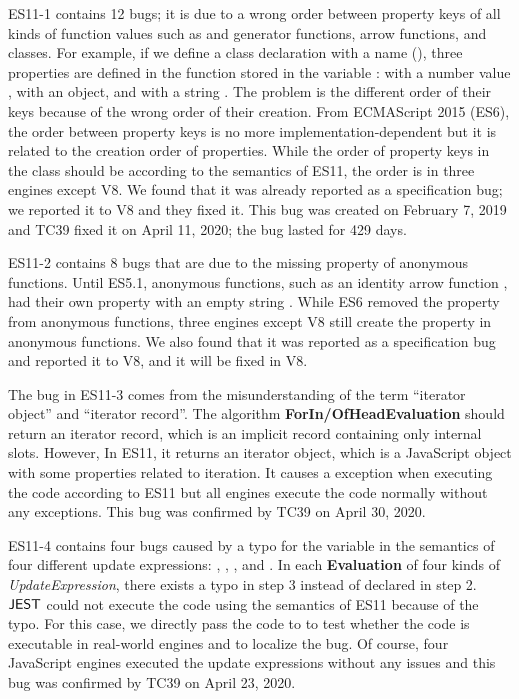 ES11-1 contains 12 bugs; it is due to a wrong order between property keys of all kinds of
function values such as  and generator functions, arrow functions, and classes.
For example, if we define a class declaration with a name 
(), three properties are defined in the function
stored in the variable :  with a number value ,
 with an object, and  with a string .
The problem is the different order of their keys because of
the wrong order of their creation.
From ECMAScript 2015 (ES6), the order between property keys is no
more implementation-dependent but it is related to the creation order of properties.
While the order of property keys in the class  should be 
according to the semantics of ES11, the order is 
in three engines except V8.  We found that it was already reported as a specification bug;
we reported it to V8 and they fixed it.
This bug was created on February 7, 2019 and TC39 fixed it on April 11, 2020;
the bug lasted for 429 days.

ES11-2 contains 8 bugs that are due to the missing property
 of anonymous functions.  Until ES5.1, anonymous functions, such as an identity arrow
function , had their own property  with an empty string .
While ES6 removed the  property from anonymous functions,
three engines except V8 still create the  property in anonymous functions.
We also found that it was reported as a specification bug and reported it
to V8, and it will be fixed in V8.

The bug in ES11-3 comes from the misunderstanding of the term ``iterator
object'' and ``iterator record''.  The algorithm \textbf{ForIn/OfHeadEvaluation}
should return an iterator record, which is an implicit record containing only internal slots.
However, In ES11, it returns an iterator object, which is a
JavaScript object with some properties related to iteration.
It causes a  exception when executing the code  according to
ES11 but all engines execute the code normally without any exceptions.
This bug was confirmed by TC39 on April 30, 2020.

ES11-4 contains four bugs caused by a typo for the variable in the
semantics of four different update expressions: , ,
, and .  In each \textbf{Evaluation} of four kinds of
\textit{UpdateExpression}, there exists a typo  in step 3
instead of  declared in step 2.  $\tool$ could not execute
the code  using the semantics of ES11 because of the typo.
For this case, we directly pass the code to  to test whether the
code is executable in real-world engines and to localize the bug.
Of course, four JavaScript engines executed the update expressions without any issues
and this bug was confirmed by TC39 on April 23, 2020.

